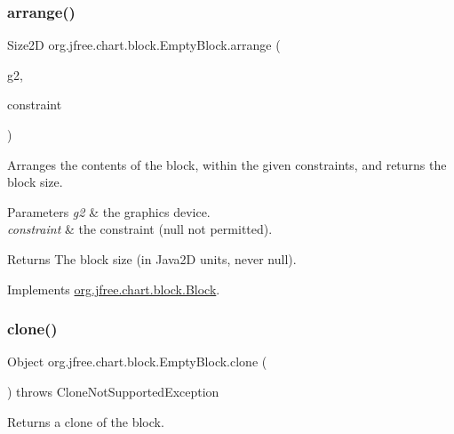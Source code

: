 \subsubsection{\texorpdfstring{arrange()}{arrange()}}
{\footnotesize\ttfamily Size2D org.\+jfree.\+chart.\+block.\+Empty\+Block.\+arrange (\begin{DoxyParamCaption}\item[{Graphics2D}]{g2,  }\item[{\mbox{\hyperlink{classorg_1_1jfree_1_1chart_1_1block_1_1_rectangle_constraint}{Rectangle\+Constraint}}}]{constraint }\end{DoxyParamCaption})}

Arranges the contents of the block, within the given constraints, and returns the block size.


\begin{DoxyParams}{Parameters}
{\em g2} & the graphics device. \\
\hline
{\em constraint} & the constraint ({\ttfamily null} not permitted).\\
\hline
\end{DoxyParams}
\begin{DoxyReturn}{Returns}
The block size (in Java2D units, never {\ttfamily null}). 
\end{DoxyReturn}


Implements \mbox{\hyperlink{interfaceorg_1_1jfree_1_1chart_1_1block_1_1_block_ab4cabbc237c5277a4a0018bab930e5fe}{org.\+jfree.\+chart.\+block.\+Block}}.

\mbox{\label{classorg_1_1jfree_1_1chart_1_1block_1_1_empty_block_a7bf3174e161f7106018c04fdee1e384d}} 
\subsubsection{\texorpdfstring{clone()}{clone()}}
{\footnotesize\ttfamily Object org.\+jfree.\+chart.\+block.\+Empty\+Block.\+clone (\begin{DoxyParamCaption}{ }\end{DoxyParamCaption}) throws Clone\+Not\+Supported\+Exception}

Returns a clone of the block.

